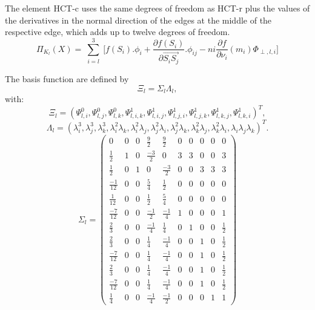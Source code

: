 \documentclass[proc]{edpsmath}
\begin{document}
The element HCT-c uses the same degrees of freedom as HCT-r plus the values of the derivatives in the normal direction of the edges at the middle of the respective edge, which adds up to twelve degrees of freedom.
\begin{equation*}
\Pi_{K_l} (X) = \sum \limits_{\substack{i=l }}^{3}{ [f(S_i).\phi_i +  \frac{\partial f(S_i)}{\partial  \overrightarrow{ S_i S_j } }.\phi_{ij} }   - ni \frac{\partial f}{\partial \nu_i}(m_i) \Phi_{\perp,l,i}]
\end{equation*} 

The basis function are defined by 
\begin{equation*}
\Xi_l =  \Sigma_l \Lambda_l,
\end{equation*} 
 \noindent with:
\begin{equation*}
  \Xi_l=(\Psi_{l,i}^0, \Psi_{l,j}^0, \Psi_{l,k}^0, \Psi_{l,i,k}^1,\Psi_{l,i,j}^1,\Psi_{l,j,i}^1,\Psi_{l,j,k}^1 ,\Psi_{l,k,j}^1,\Psi_{l,k,i}^1)^T,
\end{equation*} 
\begin{equation*}
  \Lambda_l = ( \lambda_i^3,\lambda_j^3,\lambda_k^3,\lambda_i^2\lambda_k,\lambda_i^2\lambda_j,\lambda_j^2\lambda_i,\lambda_j^2\lambda_k,\lambda_k^2\lambda_j,\lambda_k^2\lambda_i,\lambda_i\lambda_j\lambda_k)^T.
\end{equation*}  
\begin{equation*}
\Sigma_l = 
\begin{pmatrix}
	0 & 0 & 0 & \frac{9}{2} & \frac{9}{2} & 0 & 0 & 0 & 0 & 0  \\
	\frac{1}{2} & 1 & 0 & \frac{-3}{2} & 0 & 3 & 3 & 0 & 0 & 3 \\
	\frac{1}{2} & 0 & 1 & 0 & \frac{-3}{2} & 0 & 0 & 3 & 3 & 3 \\	 
	\frac{-1}{12} & 0 & 0 & \frac{ 5}{4} & \frac{ 1}{2} & 0 & 0 & 0 & 0 & 0 \\	 
	\frac{ 1}{12} & 0 & 0 & \frac{ 1}{2} & \frac{ 5}{4} & 0 & 0 & 0 & 0 & 0 \\
	\frac{-7}{12} & 0 & 0 & \frac{-1}{2} & \frac{-1}{4} & 1 & 0 & 0 & 0 & 1 \\
    \frac{ 2}{3}& 0 & 0 & \frac{-1}{4} & \frac{ 1}{4} & 0 & 1 & 0 & 0 & \frac{1}{2} \\
	\frac{ 2}{3}& 0 & 0 & \frac{ 1}{4} & \frac{-1}{4} & 0 & 0 & 1 & 0 & \frac{1}{2} \\
    \frac{-7}{12} & 0 & 0 & \frac{ 1}{4} & \frac{-1}{4} & 0 & 0 & 1 & 0 & \frac{1}{2} \\
	\frac{ 2}{3}& 0 & 0 & \frac{ 1}{4} & \frac{-1}{4} & 0 & 0 & 1 & 0 & \frac{1}{2} \\
    \frac{-7}{12} & 0 & 0 & \frac{ 1}{4} & \frac{-1}{4} & 0 & 0 & 1 & 0 & \frac{1}{2} \\
	\frac{1}{4} & 0 & 0 & \frac{-1}{4} & \frac{-1}{2} & 0 & 0 & 0 & 1 & 1 
\end{pmatrix}
\end{equation*}
\end{document}
